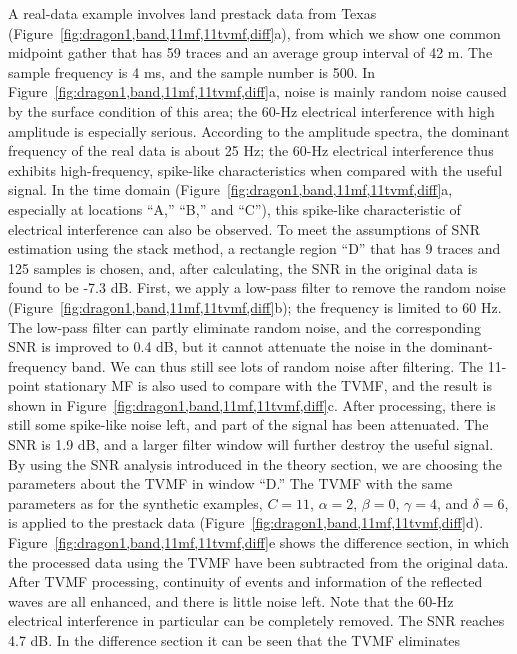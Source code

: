 A real-data example involves land prestack data from Texas 
(Figure~\ref{fig:dragon1,band,11mf,11tvmf,diff}a), from which we show one common midpoint 
gather that has 59 traces and an average group interval of 42 m. The sample frequency is 4 ms, and the sample number is 500. In 
Figure~\ref{fig:dragon1,band,11mf,11tvmf,diff}a, noise is mainly random noise caused by the surface condition of this 
area; the 60-Hz electrical 
interference with high amplitude is especially serious. According to the amplitude spectra, 
the dominant frequency of the real data is about 25 Hz; the 60-Hz electrical interference thus exhibits 
high-frequency, spike-like characteristics when compared with the useful signal. In the time domain 
(Figure~\ref{fig:dragon1,band,11mf,11tvmf,diff}a, especially at locations ``A,'' ``B,'' and ``C''), this spike-like 
characteristic of electrical interference can also be observed. To meet the assumptions of SNR 
estimation using the stack method, a rectangle region ``D'' that has 9 traces and 125 samples is chosen, and, after calculating, the SNR 
in the original data is found to be -7.3 dB. First, we apply a low-pass filter to remove 
the random noise (Figure~\ref{fig:dragon1,band,11mf,11tvmf,diff}b); the frequency is limited to 60 Hz. The 
low-pass filter can partly eliminate random noise, and the corresponding 
SNR is improved to 0.4 dB, but it cannot attenuate the noise in the dominant-frequency band. 
We can thus still see lots of random noise after filtering. The 11-point stationary MF is also 
used to compare with the TVMF, and the result is shown in Figure~\ref{fig:dragon1,band,11mf,11tvmf,diff}c. After processing, there is 
still some spike-like noise left, and part of the signal has been attenuated. The SNR is 1.9 dB, and a larger 
filter window will further destroy the useful signal. By 
using the SNR analysis introduced in the theory section, we are choosing the parameters about the TVMF in window 
``D.'' The TVMF with the same parameters as for the synthetic examples, $C=11$, $\alpha=2$, 
$\beta=0$, $\gamma=4$, and $\delta=6$, is applied to the prestack data
(Figure~\ref{fig:dragon1,band,11mf,11tvmf,diff}d). Figure~\ref{fig:dragon1,band,11mf,11tvmf,diff}e shows the difference section, in which the 
processed data using the TVMF have been subtracted from the original data. After TVMF processing, 
continuity of events and information of the reflected waves are all enhanced, and there is little 
noise left. Note that the 60-Hz electrical interference in particular can be completely removed. 
The SNR reaches 4.7 dB. In the difference section it can be seen that the TVMF eliminates 
